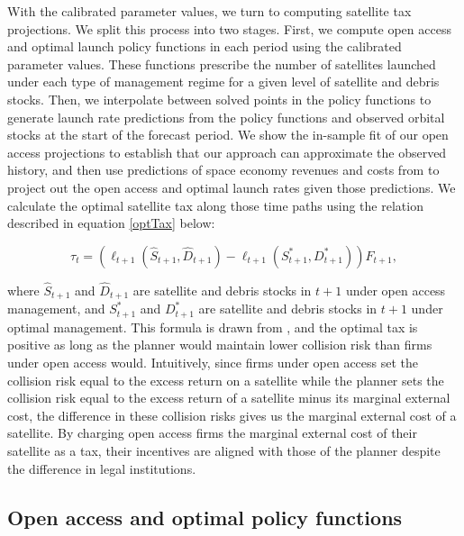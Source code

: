 \documentclass[12pt]{article}
\begin{document}
With the calibrated parameter values, we turn to computing satellite tax projections. We split this process into two stages. First, we compute open access and optimal launch policy functions in each period using the calibrated parameter values. These functions prescribe the number of satellites launched under each type of management regime for a given level of satellite and debris stocks. Then, we interpolate between solved points in the policy functions to generate launch rate predictions from the policy functions and observed orbital stocks at the start of the forecast period. We show the in-sample fit of our open access projections to establish that our approach can approximate the observed history, and then use predictions of space economy revenues and costs from \cite{MSreport} to project out the open access and optimal launch rates given those predictions. We calculate the optimal satellite tax along those time paths using the relation described in equation \ref{optTax} below:

\begin{equation}
\label{optTax}
	\tau_t = (\ell_{t+1}(\hat{S}_{t+1},\hat{D}_{t+1}) - \ell_{t+1}(S^*_{t+1},D^*_{t+1}))F_{t+1},
\end{equation}

where $\hat{S}_{t+1}$ and $\hat{D}_{t+1}$ are satellite and debris stocks in $t+1$ under open access management, and $S^*_{t+1}$ and $D^*_{t+1}$ are satellite and debris stocks in $t+1$ under optimal management. This formula is drawn from \cite{raorondinaWP}, and the optimal tax is positive as long as the planner would maintain lower collision risk than firms under open access would. Intuitively, since firms under open access set the collision risk equal to the excess return on a satellite while the planner sets the collision risk equal to the excess return of a satellite minus its marginal external cost, the difference in these collision risks gives us the marginal external cost of a satellite. By charging open access firms the marginal external cost of their satellite as a tax, their incentives are aligned with those of the planner despite the difference in legal institutions.

\subsection{Open access and optimal policy functions}
\end{document}
